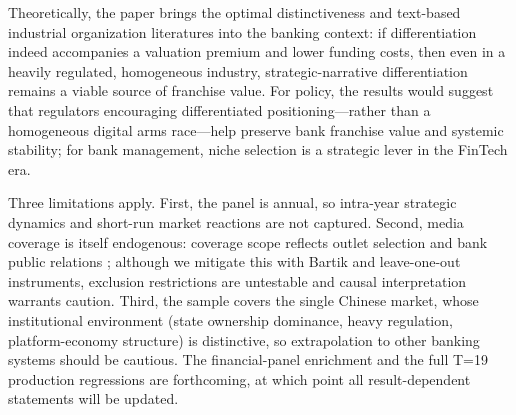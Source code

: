 Theoretically, the paper brings the optimal distinctiveness and
text-based industrial organization literatures into the banking
context: if differentiation indeed accompanies a valuation premium
and lower funding costs, then even in a heavily regulated,
homogeneous industry, strategic-narrative differentiation remains a
viable source of franchise value. For policy, the results
 would suggest that
regulators encouraging differentiated positioning---rather than a
homogeneous digital arms race---help preserve bank franchise value
and systemic stability; for bank management, niche selection is a
strategic lever in the FinTech era.

Three limitations apply. First, the panel is annual, so intra-year
strategic dynamics and short-run market reactions are not captured.
Second, media coverage is itself endogenous: coverage scope reflects
outlet selection and bank public relations \parencite{gurun2012hype};
although we mitigate this with Bartik and leave-one-out instruments,
exclusion restrictions are untestable and causal interpretation
warrants caution. Third, the sample covers the single Chinese market,
whose institutional environment (state ownership dominance, heavy
regulation, platform-economy structure) is distinctive, so
extrapolation to other banking systems should be cautious. The
financial-panel enrichment and the full T=19 production regressions
are forthcoming, at which point all result-dependent statements will
be updated.


\printbibliography


